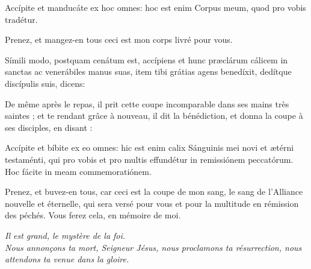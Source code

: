 \documentclass[twoside]{article}
\begin{document}
\begin{paracol}{2}
Accípite et manducáte ex hoc omnes:
hoc est enim Corpus meum,
quod pro vobis tradétur. 

\switchcolumn

Prenez, et mangez-en tous ceci est mon corps livré pour vous.

\switchcolumn*

Símili modo, postquam cenátum est, 
accípiens et hunc præclárum cálicem
in sanctas ac venerábiles manus suas,
item tibi grátias agens benedíxit,
dedítque discípulis suis, dicens: 

\switchcolumn

De même après le repas,
il prit cette coupe incomparable dans ses mains très saintes ; 
et te rendant grâce à nouveau, il dit la bénédiction, et donna la coupe à ses disciples, en disant : 

\switchcolumn*

Accípite et bíbite ex eo omnes:
hic est enim calix Sánguinis mei
novi et ætérni testaménti,
qui pro vobis et pro multis effundétur
in remissiónem peccatórum.
Hoc fácite in meam commemoratiónem. 

\switchcolumn

Prenez, et buvez-en tous, car ceci est la coupe de mon sang, le sang de l'Alliance nouvelle et éternelle, qui sera versé pour vous et pour la multitude en rémission des péchés. Vous ferez cela, en mémoire de moi.

\end{paracol}


\emph{\vv Il est grand, le mystère de la foi. \\
\rr Nous annonçons ta mort, Seigneur Jésus, nous proclamons ta résurrection, nous attendons ta venue dans la gloire.}
\end{document}
